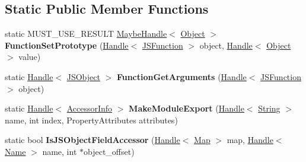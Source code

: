 \subsection*{Static Public Member Functions}
\begin{DoxyCompactItemize}
\item 
static M\+U\+S\+T\+\_\+\+U\+S\+E\+\_\+\+R\+E\+S\+U\+LT \hyperlink{classv8_1_1internal_1_1_maybe_handle}{Maybe\+Handle}$<$ \hyperlink{classv8_1_1internal_1_1_object}{Object} $>$ {\bfseries Function\+Set\+Prototype} (\hyperlink{classv8_1_1internal_1_1_handle}{Handle}$<$ \hyperlink{classv8_1_1internal_1_1_j_s_function}{J\+S\+Function} $>$ object, \hyperlink{classv8_1_1internal_1_1_handle}{Handle}$<$ \hyperlink{classv8_1_1internal_1_1_object}{Object} $>$ value)\hypertarget{classv8_1_1internal_1_1_accessors_a46069cc262b04995f4464b2a6b77f419}{}\label{classv8_1_1internal_1_1_accessors_a46069cc262b04995f4464b2a6b77f419}

\item 
static \hyperlink{classv8_1_1internal_1_1_handle}{Handle}$<$ \hyperlink{classv8_1_1internal_1_1_j_s_object}{J\+S\+Object} $>$ {\bfseries Function\+Get\+Arguments} (\hyperlink{classv8_1_1internal_1_1_handle}{Handle}$<$ \hyperlink{classv8_1_1internal_1_1_j_s_function}{J\+S\+Function} $>$ object)\hypertarget{classv8_1_1internal_1_1_accessors_ac04c9e4d84d0ee6a47df67d582652bdc}{}\label{classv8_1_1internal_1_1_accessors_ac04c9e4d84d0ee6a47df67d582652bdc}

\item 
static \hyperlink{classv8_1_1internal_1_1_handle}{Handle}$<$ \hyperlink{classv8_1_1internal_1_1_accessor_info}{Accessor\+Info} $>$ {\bfseries Make\+Module\+Export} (\hyperlink{classv8_1_1internal_1_1_handle}{Handle}$<$ \hyperlink{classv8_1_1internal_1_1_string}{String} $>$ name, int index, Property\+Attributes attributes)\hypertarget{classv8_1_1internal_1_1_accessors_a659f5cfdc0ce5805f19fd0fe320e4e5c}{}\label{classv8_1_1internal_1_1_accessors_a659f5cfdc0ce5805f19fd0fe320e4e5c}

\item 
static bool {\bfseries Is\+J\+S\+Object\+Field\+Accessor} (\hyperlink{classv8_1_1internal_1_1_handle}{Handle}$<$ \hyperlink{classv8_1_1internal_1_1_map}{Map} $>$ map, \hyperlink{classv8_1_1internal_1_1_handle}{Handle}$<$ \hyperlink{classv8_1_1internal_1_1_name}{Name} $>$ name, int $\ast$object\+\_\+offset)\hypertarget{classv8_1_1internal_1_1_accessors_a5b4d1d26837b68779b95631f8693c1ba}{}\label{classv8_1_1internal_1_1_accessors_a5b4d1d26837b68779b95631f8693c1ba}


\end{DoxyCompactItemize}
